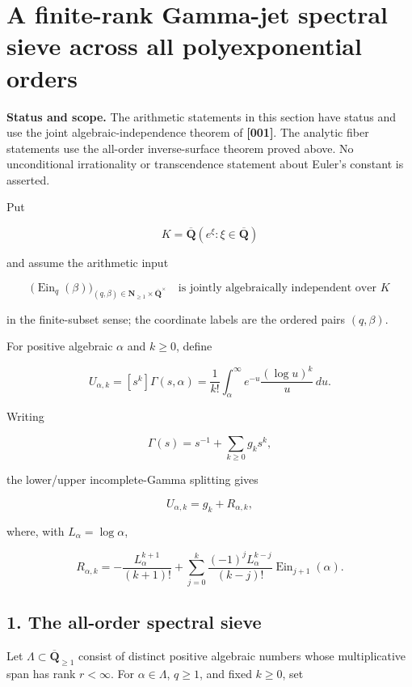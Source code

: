 \section{A finite-rank Gamma-jet spectral sieve across all polyexponential orders}

\begin{notebox}
\textbf{Status and scope.}  The arithmetic statements in this section have
status \RPASS{} and use the joint algebraic-independence theorem of
\textbf{[001]}.  The analytic fiber statements use the all-order inverse-surface
theorem proved above.  No unconditional irrationality or transcendence
statement about Euler's constant is asserted.
\end{notebox}

Put

\[
 K=\overline{\mathbf Q}
   (e^\xi:\xi\in\overline{\mathbf Q})
\]

and assume the arithmetic input

\[
 \bigl(\operatorname{Ein}_q(\beta)\bigr)_
 {(q,\beta)\in\mathbf N_{\geq1}\times
 \overline{\mathbf Q}^{\times}}
 \quad\text{is jointly algebraically independent over }K        \tag{GS-0.1}
\]

in the finite-subset sense; the coordinate labels are the ordered pairs
\((q,\beta)\).

For positive algebraic \(\alpha\) and \(k\geq0\), define

\[
 U_{\alpha,k}=[s^k]\Gamma(s,\alpha)
 =\frac1{k!}\int_\alpha^\infty
 e^{-u}\frac{(\log u)^k}{u}\,du.                              \tag{GS-0.2}
\]

Writing

\[
 \Gamma(s)=s^{-1}+\sum_{k\geq0}g_ks^k,
\]

the lower/upper incomplete-Gamma splitting gives

\[
 U_{\alpha,k}=g_k+R_{\alpha,k},                                \tag{GS-0.3}
\]

where, with \(L_\alpha=\log\alpha\),

\[
 R_{\alpha,k}=-\frac{L_\alpha^{k+1}}{(k+1)!}
 +\sum_{j=0}^k
 \frac{(-1)^jL_\alpha^{k-j}}{(k-j)!}
 \operatorname{Ein}_{j+1}(\alpha).                            \tag{GS-0.4}
\]

\subsection{1. The all-order spectral sieve}

Let \(\Lambda\subset\overline{\mathbf Q}_{\geq1}\) consist of distinct
positive algebraic numbers whose multiplicative span has rank \(r<\infty\).
For \(\alpha\in\Lambda\), \(q\geq1\), and fixed \(k\geq0\), set

